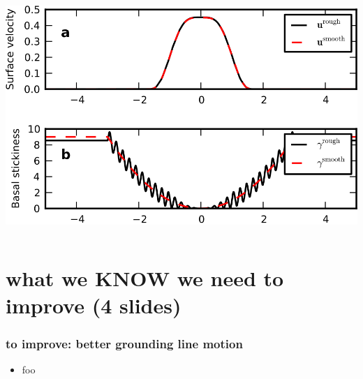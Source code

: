 \documentclass[hide notes,intlimits]{beamer}
\begin{document}
\begin{frame}
\begin{columns}
\begin{column}{0.5\textwidth}
\begin{center}
\bigskip
    \includegraphics[width=1.0\textwidth]{rough_smooth_forward}
  \end{center}
\end{column}
\end{columns}
\end{frame}


\section[to improve]{what we KNOW we need to improve (4 slides)}

\begin{frame}
  \frametitle{to improve: better grounding line motion}
  \begin{itemize}
  \item foo
  \end{itemize}
\end{frame}
\end{document}
